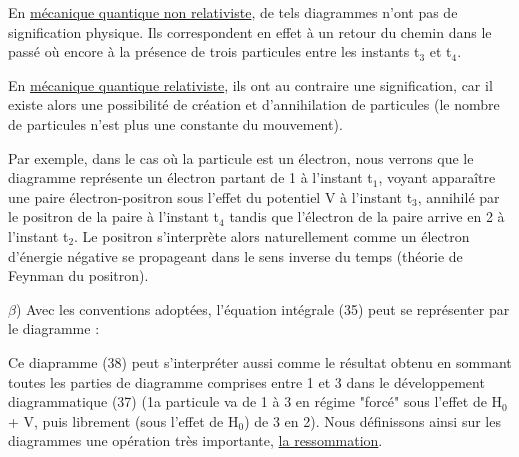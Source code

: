 En \ul{mécanique quantique non relativiste}, de tels diagrammes n'ont
pas de signification physique. Ils correspondent en effet à un retour du
chemin dans le passé où encore à la présence de trois particules entre les
instants t$_3$ et t$_4$.

En \ul{mécanique quantique relativiste}, ils ont au contraire une
signification, car il existe alors une possibilité de création et d'annihilation
de particules (le nombre de particules n'est plus une constante
du mouvement).

Par exemple, dans le cas où la particule est un électron, nous
verrons que le diagramme représente un électron partant de 1 à l'instant t$_1$,
voyant apparaître une paire électron-positron sous l'effet du potentiel V
à l'instant t$_3$, annihilé par le positron de la paire à l'instant t$_4$ tandis
que l'électron de la paire arrive en 2 à l'instant t$_2$. Le positron s'interprète
alors naturellement comme un électron d'énergie négative se propageant
dans le sens inverse du temps (théorie de Feynman du positron).

$\beta$) Avec les conventions adoptées, l'équation intégrale (35) peut se
représenter par le diagramme :
\begin{flushright}
 \end{flushright}
Ce diapramme (38) peut s'interpréter aussi comme le résultat obtenu en
sommant toutes les parties de diagramme comprises entre 1 et 3 dans le
développement diagrammatique (37) (1a particule va de 1 à 3 en régime
"forcé" sous l'effet de H$_0$ + V, puis librement (sous l'effet de H$_0$) de
3 en 2). Nous définissons ainsi sur les diagrammes une opération très
importante, \ul{la ressommation}.

